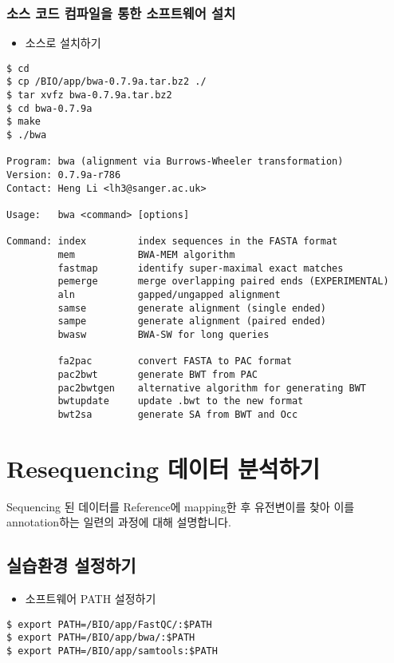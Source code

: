 \documentclass{article}
\begin{document}
\subsubsection{소스 코드 컴파일을 통한 소프트웨어 설치}
\begin{itemize}
\item
  \begin{itemize}
  소스로 설치하기 
  \end{itemize}
\end{itemize}
\begin{lstlisting}[frame=single,style=Bash,xleftmargin=1.4cm,xrightmargin=1.4cm]
$ cd
$ cp /BIO/app/bwa-0.7.9a.tar.bz2 ./
$ tar xvfz bwa-0.7.9a.tar.bz2
$ cd bwa-0.7.9a
$ make
$ ./bwa

Program: bwa (alignment via Burrows-Wheeler transformation)
Version: 0.7.9a-r786
Contact: Heng Li <lh3@sanger.ac.uk>

Usage:   bwa <command> [options]

Command: index         index sequences in the FASTA format
         mem           BWA-MEM algorithm
         fastmap       identify super-maximal exact matches
         pemerge       merge overlapping paired ends (EXPERIMENTAL)
         aln           gapped/ungapped alignment
         samse         generate alignment (single ended)
         sampe         generate alignment (paired ended)
         bwasw         BWA-SW for long queries

         fa2pac        convert FASTA to PAC format
         pac2bwt       generate BWT from PAC
         pac2bwtgen    alternative algorithm for generating BWT
         bwtupdate     update .bwt to the new format
         bwt2sa        generate SA from BWT and Occ

\end{lstlisting}

\clearpage
\section{Resequencing 데이터 분석하기}
Sequencing 된 데이터를 Reference에 mapping한 후 유전변이를 찾아 이를 annotation하는 일련의 과정에 대해 설명합니다. 

\subsection{실습환경 설정하기}

\begin{itemize}
\item
  \begin{itemize}
  소프트웨어 PATH 설정하기  
  \end{itemize}
\end{itemize}
\begin{lstlisting}[frame=single,style=Bash,xleftmargin=1.4cm,xrightmargin=1.4cm]
$ export PATH=/BIO/app/FastQC/:$PATH
$ export PATH=/BIO/app/bwa/:$PATH
$ export PATH=/BIO/app/samtools:$PATH
\end{lstlisting}
\end{document}
